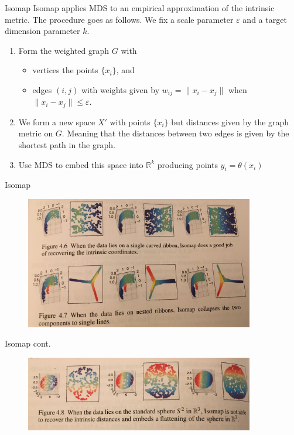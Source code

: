 \documentclass{beamer}
\begin{document}
\begin{frame}{Isomap}
	Isomap applies MDS to an empirical approximation of the intrinsic metric.
	The procedure goes as follows. We fix a scale parameter $\varepsilon$ and a target dimension parameter $k$.
	
	\begin{enumerate}
		\item Form the weighted graph $G$ with
		\begin{itemize}
			\item vertices the points $\{x_i\}$, and
			\item edges $(i,j)$ with weights given by $w_{ij}=\| x_i -x_j\|$ when $\|x_i -x_j\| \le \varepsilon$.
		\end{itemize}
		\item We form a new space $X'$ with points $\{x_i\}$ but distances given by the graph metric on $G$.  Meaning that the distances between two edges is given by the shortest path in the graph.
		\item Use MDS to embed this space into $\mathbb{R}^k$ producing points $y_i = \theta(x_i)$
	\end{enumerate}
\end{frame}

\begin{frame}{Isomap}
	\begin{figure}[h]
		\centering
		\includegraphics[width=10cm]{../../Figures/fig_manifolde_4_7.jpg}
	\end{figure}	
\end{frame}

\begin{frame}{Isomap cont.}
		\begin{figure}[h]
		\centering
		\includegraphics[width=10cm]{../../Figures/fig_manifolde_4_8.jpg}
	\end{figure}	
\end{frame}
\end{document}
